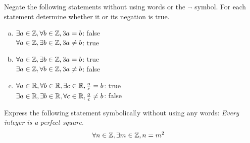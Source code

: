 \documentclass{agony}
\begin{document}
\question Negate the following statements without using words or the $\lnot$ symbol.
For each statement determine whether it or its negation is true.
\begin{enumerate}[(a)]
  \item $\exists a \in \mathbb{Z}, \forall b \in \mathbb{Z}, 3a=b$: false \\
        $\forall a \in \mathbb{Z}, \exists b \in \mathbb{Z}, 3a \neq b$: true
  \item $\forall a \in \mathbb{Z}, \exists b \in \mathbb{Z}, 3a=b$: true \\
        $\exists a \in \mathbb{Z}, \forall b \in \mathbb{Z}, 3a \neq b$: false
  \item $\forall a \in \mathbb{R}, \forall b \in \mathbb{R}, \exists c \in \mathbb{R}, \frac{a}{c}=b$: true \\
        $\exists a \in \mathbb{R}, \exists b \in \mathbb{R}, \forall c \in \mathbb{R}, \frac{a}{c} \neq b$: false
\end{enumerate}


\question Express the following statement symbolically without using any words:
\emph{Every integer is a perfect square.}
\[ \forall n\in\mathbb{Z}, \exists m\in\mathbb{Z}, n = m^2 \]
\end{document}
